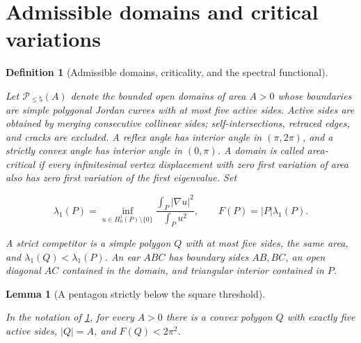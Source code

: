 \documentclass[11pt,a4paper]{article}
\theoremstyle{proofmanuscript}
\newtheorem{lemma}[theorem]{Lemma}
\newtheorem{definition}[theorem]{Definition}
\begin{document}
\section{Admissible domains and critical variations}

\begin{definition}[Admissible domains, criticality, and the spectral functional]\label{def-domain}

Let \(\mathscr P_{\le5}(A)\) denote the bounded open domains of area \(A>0\) whose boundaries are simple polygonal Jordan curves with at most five active sides. Active sides are obtained by merging consecutive collinear sides; self-intersections, retraced edges, and cracks are excluded. A reflex angle has interior angle in \((\pi,2\pi)\), and a strictly convex angle has interior angle in \((0,\pi)\). A domain is called area-critical if every infinitesimal vertex displacement with zero first variation of area also has zero first variation of the first eigenvalue. Set

\[
\lambda_1(P)=\inf_{u\in H_0^1(P)\setminus\{0\}}\frac{\int_P|\nabla u|^2}{\int_Pu^2},\qquad F(P)=|P|\lambda_1(P).
\]

A strict competitor is a simple polygon \(Q\) with at most five sides, the same area, and \(\lambda_1(Q)<\lambda_1(P)\). An ear \(ABC\) has boundary sides \(AB,BC\), an open diagonal \(AC\) contained in the domain, and triangular interior contained in \(P\).

\end{definition}

\begin{lemma}[A pentagon strictly below the square threshold]\label{lem-square}

In the notation of \ref{def-domain}, for every \(A>0\) there is a convex polygon \(Q\) with exactly five active sides, \(|Q|=A\), and \(F(Q)<2\pi^2\).

\end{lemma}
\end{document}

